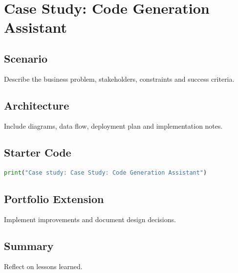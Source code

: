 \chapter{Case Study: Code Generation Assistant}
\label{chap:vol14-2}



\section{Scenario}
Describe the business problem, stakeholders, constraints and success criteria.

\section{Architecture}
Include diagrams, data flow, deployment plan and implementation notes.

\section{Starter Code}
\begin{lstlisting}[language=Python]
print("Case study: Case Study: Code Generation Assistant")
\end{lstlisting}

\section{Portfolio Extension}
Implement improvements and document design decisions.

\section{Summary}
Reflect on lessons learned.
